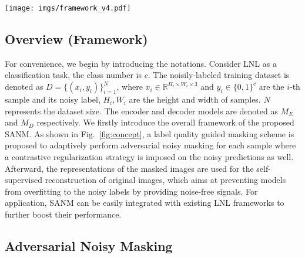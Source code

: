 \documentclass[10pt,twocolumn,letterpaper]{article}
\begin{document}
\begin{figure*}[!t]
\centering
\texttt{[image: imgs/framework\_v4.pdf]}
\vspace{-2em}
\caption{{The technical workflow of the proposed SANM. Three components are included in SANM: AMG (Adversarial Masking Generation), NLR (Noisy Label Regularization), SMR (Self-supervised Masking Reconstruction). In AMG and NLR, firstly feed the images to an encoder and generate activation maps. And a label quality guided adversarial masking strategy is proposed to modulate the images and noisy labels simultaneously. Further, an auxiliary decode branch is designed in SMR to reconstruct input images from the features of masked images. Finally, the generated modulated images and labels of SANM together with the reconstruction loss can be directly adopted for the training of existing LNL framework.}}
\label{fig:concept}
\vspace{-1em}
\end{figure*}


\subsection{Overview (Framework)}

For convenience, we begin by introducing the notations. Consider LNL as a classification task, the class number is $c$. The noisily-labeled training dataset is denoted as $ D = \{{(x_i, y_i)}\}_{i=1} ^{N}$, where $x_i \in \mathbb{R}^{H_i\times W_i\times 3}$ and $y_i \in \{0, 1\}^c$ are the $i$-th sample and its noisy label, $H_i, W_i$ are the height and width of samples. $N$ represents the dataset size. The encoder and decoder models are denoted as $M_E$ and $M_D$ respectively. We firstly introduce the overall framework of the proposed SANM. As shown in Fig.~\ref{fig:concept}, a label quality guided masking scheme is proposed to adaptively perform adversarial noisy masking for each sample where a contrastive regularization strategy is imposed on the noisy predictions as well. Afterward, the representations of the masked images are used for the self-supervised reconstruction of original images, which aims at preventing models from overfitting to the noisy labels by providing noise-free signals. For application, SANM can be easily integrated with existing LNL frameworks to further boost their performance.

\subsection{Adversarial Noisy Masking}
\end{document}

